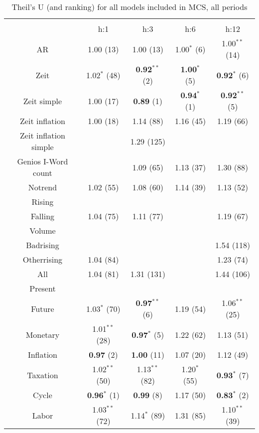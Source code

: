 
\begin{table}[!htbp] \centering 
  \caption{Theil's U (and ranking) for all models included in MCS, all periods} 
  \label{} 
\scriptsize 
\begin{tabular}{@{\extracolsep{5pt}} ccccc} 
\\[-1.8ex]\hline 
\hline \\[-1.8ex] 
 & h:1 & h:3 & h:6 & h:12 \\ 
AR & 1.00 (13) & 1.00 (13) & 1.00$^{*}$ (6) & 1.00$^{**}$ (14) \\ 
Zeit & 1.02$^{*}$ (48) & \textbf{0.92$^{**}$} (2) & \textbf{1.00$^{*}$} (5) & \textbf{0.92$^{*}$} (6) \\ 
Zeit simple & 1.00 (17) & \textbf{0.89} (1) & \textbf{0.94$^{*}$} (1) & \textbf{0.92$^{**}$} (5) \\ 
Zeit inflation & 1.00 (18) & 1.14 (88) & 1.16 (45) & 1.19 (66) \\ 
Zeit inflation simple &  & 1.29 (125) &  &  \\ 
Genios I-Word count &  & 1.09 (65) & 1.13 (37) & 1.30 (88) \\ 
Notrend & 1.02 (55) & 1.08 (60) & 1.14 (39) & 1.13 (52) \\ 
Rising &  &  &  &  \\ 
Falling & 1.04 (75) & 1.11 (77) &  & 1.19 (67) \\ 
Volume &  &  &  &  \\ 
Badrising &  &  &  & 1.54 (118) \\ 
Otherrising & 1.04 (84) &  &  & 1.23 (74) \\ 
All & 1.04 (81) & 1.31 (131) &  & 1.44 (106) \\ 
Present &  &  &  &  \\ 
Future & 1.03$^{*}$ (70) & \textbf{0.97$^{**}$} (6) & 1.19 (54) & 1.06$^{**}$ (25) \\ 
Monetary & 1.01$^{**}$ (28) & \textbf{0.97$^{*}$} (5) & 1.22 (62) & 1.13 (51) \\ 
Inflation & \textbf{0.97} (2) & \textbf{1.00} (11) & 1.07 (20) & 1.12 (49) \\ 
Taxation & 1.02$^{**}$ (50) & 1.13$^{**}$ (82) & 1.20$^{*}$ (55) & \textbf{0.93$^{*}$} (7) \\ 
Cycle & \textbf{0.96$^{*}$} (1) & \textbf{0.99} (8) & 1.17 (50) & \textbf{0.83$^{*}$} (2) \\ 
Labor & 1.03$^{**}$ (72) & 1.14$^{*}$ (89) & 1.31 (85) & 1.10$^{**}$ (39) \\ 

\end{tabular}
\end{table}
